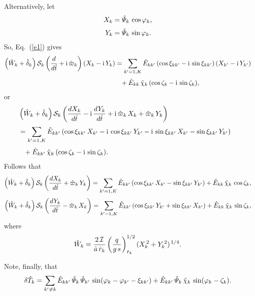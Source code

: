 \documentclass[12pt]{article}
\begin{document}
Alternatively, let
\begin{align}
X_k &= \hat{\mit\Psi}_k\,\cos\varphi_k,\\[0.5ex]
Y_k &= \hat{\mit\Psi}_k\,\sin\varphi_k.
\end{align}
So, Eq.~(\ref{e1}) gives
\begin{align}
\left(\hat{W}_k +\hat{\delta}_k\right){\cal S}_k\left(\frac{d}{d\hat{t}} + {\rm i}\,\hat{\varpi}_k\right)(X_k - {\rm i}\,Y_k)&=
\sum_{k'=1,K}\hat{E}_{kk'}\,(\cos\xi_{kk'} - {\rm i}\,\sin\xi_{kk'})\,(X_{k'} - {\rm i}\,Y_{k'})\nonumber\\[0.5ex]
&\phantom{=}+ \hat{E}_{kk}\,\hat{\chi}_k\,(\cos\zeta_k - {\rm i }\,\sin\zeta_k),
\end{align}
or
\begin{align}
&\left(\hat{W}_k +\hat{\delta}_k\right){\cal S}_k\left(\frac{dX_k}{d\hat{t}} - {\rm i}\,\frac{dY_k}{d\hat{t}} + {\rm i}\,\hat{\varpi}_k\,X_k
+\hat{\varpi}_k\,Y_k\right)&\nonumber\\[0.5ex]
&= \sum_{k'=1,K}\hat{E}_{kk'}\,(\cos\xi_{kk'}\,X_{k'} -{\rm i}\,\cos\xi_{kk'}\,Y_{k'}
-{\rm i}\,\sin\xi_{kk'}\,X_{k'} -\sin\xi_{kk'}\,Y_{k'})\nonumber\\[0.5ex]
&\phantom{=} + \hat{E}_{kk'}\,\hat{\chi}_k\,(\cos\zeta_k - {\rm i}\,\sin\zeta_k).
\end{align}
Follows that
\begin{align}
\left(\hat{W}_k +\hat{\delta}_k\right){\cal S}_k\left(\frac{dX_k}{d\hat{t}} 
+\hat{\varpi}_k\,Y_k\right)= \sum_{k'=1,K}\hat{E}_{kk'}\,(\cos\xi_{kk'}\,X_{k'}  -\sin\xi_{kk'}\,Y_{k'}) + \hat{E}_{kk}\,\hat{\chi}_k\,\cos\zeta_k,\\[0.5ex]
\left(\hat{W}_k +\hat{\delta}_k\right){\cal S}_k\left(\frac{dY_k}{d\hat{t}} -\hat{\varpi}_k\,X_k\right)
= \sum_{k'=1,K}\hat{E}_{kk'}\,(\cos\xi_{kk'}\,Y_{k'}
+\sin\xi_{kk'}\,X_{k'}) + \hat{E}_{kk}\,\hat{\chi}_k\,\sin\zeta_k,
\end{align}
where
\begin{equation}\label{e23}
\hat{W}_k =\frac{2\,{\cal I}}{\hat{a}\,\hat{r}_k}\left(\frac{q}{g\,s}\right)^{1/2}_{\hat{r}_k} (X_k^{\,2} + Y_k^{\,2})^{\,1/4}.
\end{equation}

Note, finally, that
\begin{equation}
\delta \hat{T}_k = \sum_{k'\neq k} \hat{E}_{kk'}\,\hat{\mit\Psi}_k\,\hat{\mit\Psi}_{k'}\,\sin(\varphi_k-\varphi_{k'}-\xi_{kk'}) + \hat{E}_{kk'}\,\hat{\mit\Psi}_k\,\hat{\chi}_k\,\sin(\varphi_k-\zeta_k).
\end{equation}
\end{document}
